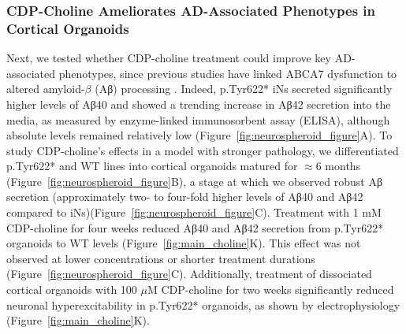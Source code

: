 \subsubsection{CDP-Choline Ameliorates AD-Associated Phenotypes in Cortical Organoids}
Next, we tested whether CDP-choline treatment could improve key AD-associated phenotypes, since previous studies have linked ABCA7 dysfunction to altered amyloid-$\beta$ (Aβ) processing \cite{Satoh2015-yu,Sakae2016-uy,Bamji-Mirza2018-xt,Chan2008-qu,De_Roeck2018-fw}. Indeed, p.Tyr622* iNs secreted significantly higher levels of Aβ40 and showed a trending increase in Aβ42 secretion into the media, as measured by enzyme-linked immunosorbent assay (ELISA), although absolute levels remained relatively low (Figure~\ref{fig:neurospheroid_figure}A). To study CDP-choline's effects in a model with stronger pathology, we differentiated p.Tyr622* and WT lines into cortical organoids matured for $\approx 6$ months (Figure~\ref{fig:neurospheroid_figure}B), a stage at which we observed robust Aβ secretion (approximately two- to four-fold higher levels of Aβ40 and Aβ42 compared to iNs)(Figure~\ref{fig:neurospheroid_figure}C). Treatment with 1 mM CDP-choline for four weeks reduced Aβ40 and Aβ42 secretion from p.Tyr622* organoids to WT levels (Figure~\ref{fig:main_choline}K). This effect was not observed at lower concentrations or shorter treatment durations (Figure~\ref{fig:neurospheroid_figure}C). Additionally, treatment of dissociated cortical organoids with 100 $\mu$M CDP-choline for two weeks significantly reduced neuronal hyperexcitability in p.Tyr622* organoids, as shown by electrophysiology (Figure~\ref{fig:main_choline}K).

